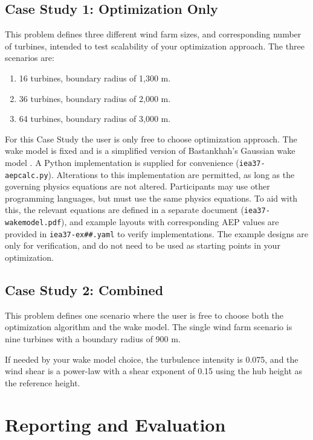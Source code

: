 \documentclass{article}
\begin{document}
    \subsection{Case Study 1: Optimization Only}

        This problem defines three different wind farm sizes, and corresponding number of turbines, intended to test scalability of your optimization approach.  The three scenarios are:
        \begin{enumerate}
            \item 16 turbines, boundary radius of 1,300 m.
            \item 36 turbines, boundary radius of 2,000 m.
            \item 64 turbines, boundary radius of 3,000 m.
        \end{enumerate}

        For this Case Study the user is only free to choose optimization approach.
        The wake model is fixed and is a simplified version of Bastankhah's Gaussian wake model \cite{Thomas2018, Bastankhah2014, Bastankhah2016}.
        A Python implementation is supplied for convenience (\texttt{iea37-aepcalc.py}).
        Alterations to this implementation are permitted, as long as the governing physics equations are not altered.
        Participants may use other programming languages, but must use the same physics equations.
        To aid with this, the relevant equations are defined in a separate document (\texttt{iea37-wakemodel.pdf}), and example layouts with corresponding AEP values are provided in \texttt{iea37-ex\#\#.yaml} to verify implementations.
        The example designs are only for verification, and do not need to be used as starting points in your optimization.

    \subsection{Case Study 2: Combined}

        This problem defines one scenario where the user is free to choose both the optimization algorithm and the wake model.
        The single wind farm scenario is nine turbines with a boundary radius of 900 m.
        
        If needed by your wake model choice, the turbulence intensity is 0.075, and the wind shear is a power-law with a shear exponent of 0.15 using the hub height as the reference height.

\section{Reporting and Evaluation}
\end{document}

